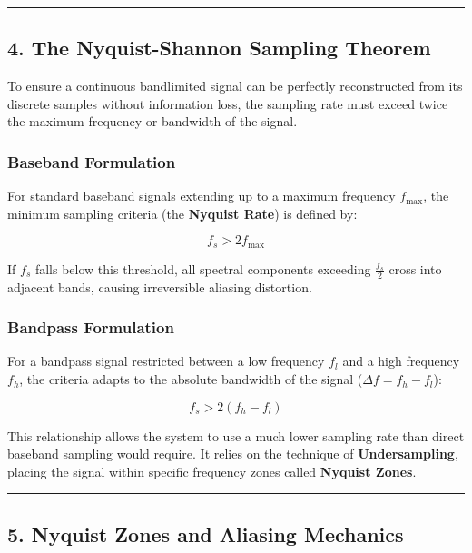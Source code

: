 \documentclass[
]{article}
\begin{document}
\begin{center}\rule{0.5\linewidth}{0.5pt}\end{center}

\subsection{4. The Nyquist-Shannon Sampling
Theorem}\label{the-nyquist-shannon-sampling-theorem}

To ensure a continuous bandlimited signal can be perfectly reconstructed
from its discrete samples without information loss, the sampling rate
must exceed twice the maximum frequency or bandwidth of the signal.

\subsubsection{Baseband Formulation}\label{baseband-formulation}

For standard baseband signals extending up to a maximum frequency
\(f_{\max}\), the minimum sampling criteria (the \textbf{Nyquist Rate})
is defined by:

\[f_s > 2f_{\max}\]

If \(f_s\) falls below this threshold, all spectral components exceeding
\(\frac{f_s}{2}\) cross into adjacent bands, causing irreversible
aliasing distortion.

\subsubsection{Bandpass Formulation}\label{bandpass-formulation}

For a bandpass signal restricted between a low frequency \(f_l\) and a
high frequency \(f_h\), the criteria adapts to the absolute bandwidth of
the signal (\(\Delta f = f_h - f_l\)):

\[f_s > 2(f_h - f_l)\]

This relationship allows the system to use a much lower sampling rate
than direct baseband sampling would require. It relies on the technique
of \textbf{Undersampling}, placing the signal within specific frequency
zones called \textbf{Nyquist Zones}.

\begin{center}\rule{0.5\linewidth}{0.5pt}\end{center}

\subsection{5. Nyquist Zones and Aliasing
Mechanics}\label{nyquist-zones-and-aliasing-mechanics}
\end{document}
